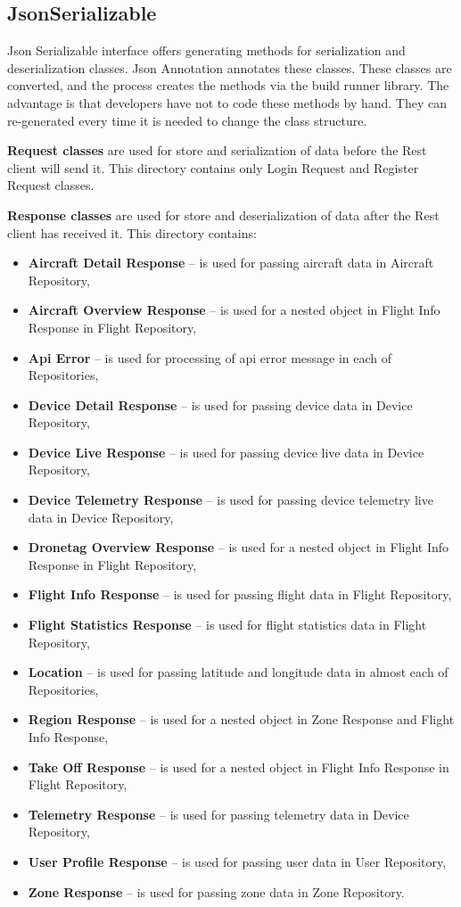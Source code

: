 \subsection{JsonSerializable}\label{subsec:jsonserializable-classes}
Json Serializable interface offers generating methods for serialization and deserialization classes.
Json Annotation annotates these classes.
These classes are converted, and the process creates the methods via the build runner library.
The advantage is that developers have not to code these methods by hand.
They can re-generated every time it is needed to change the class structure.

\textbf{Request classes} are used for store and serialization of data before the Rest client will send it.
This directory contains only Login Request and Register Request classes.

\textbf{Response classes} are used for store and deserialization of data after the Rest client has received it.
This directory contains:
\begin{itemize}
    \item \textbf{Aircraft Detail Response} -- is used for passing aircraft data in Aircraft Repository,
    \item \textbf{Aircraft Overview Response} -- is used for a nested object in Flight Info Response in Flight Repository,
    \item \textbf{Api Error} -- is used for processing of \acrshort{api} error message in each of Repositories,
    \item \textbf{Device Detail Response} -- is used for passing device data in Device Repository,
    \item \textbf{Device Live Response} -- is used for passing device live data in Device Repository,
    \item \textbf{Device Telemetry Response} -- is used for passing device telemetry live data in Device Repository,
    \item \textbf{Dronetag Overview Response} -- is used for a nested object in Flight Info Response in Flight Repository,
    \item \textbf{Flight Info Response} -- is used for passing flight data in Flight Repository,
    \item \textbf{Flight Statistics Response} -- is used for flight statistics data in Flight Repository,
    \item \textbf{Location} -- is used for passing latitude and longitude data in almost each of Repositories,
    \item \textbf{Region Response} -- is used for a nested object in Zone Response and Flight Info Response,
    \item \textbf{Take Off Response} -- is used for a nested object in Flight Info Response in Flight Repository,
    \item \textbf{Telemetry Response} -- is used for passing telemetry data in Device Repository,
    \item \textbf{User Profile Response} -- is used for passing user data in User Repository,
    \item \textbf{Zone Response} -- is used for passing zone data in Zone Repository.
\end{itemize}
